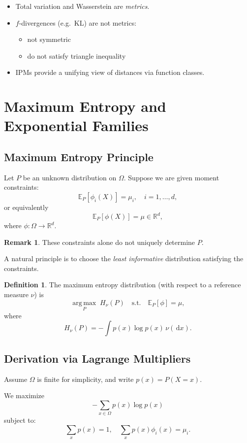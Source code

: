 \documentclass[12pt,oneside]{book}
\numberwithin{equation}{section}
\theoremstyle{definition}
\newtheorem{definition}{Definition}[section]
\newtheorem{remark}{Remark}[section]
\theoremstyle{plain}
\theoremstyle{remark}
\newcommand{\R}{\mathbb{R}}
\newcommand{\E}{\mathbb{E}}
\newcommand{\argmax}{\operatorname*{arg\,max}}
\newcommand{\dd}{\,\mathrm{d}}
\begin{document}
\begin{itemize}
\item Total variation and Wasserstein are \emph{metrics}.
\item $f$-divergences (e.g.\ KL) are not metrics:
\begin{itemize}
\item not symmetric
\item do not satisfy triangle inequality
\end{itemize}
\item IPMs provide a unifying view of distances via function classes.
\end{itemize}

\section{Maximum Entropy and Exponential Families}

\subsection{Maximum Entropy Principle}

Let $P$ be an unknown distribution on $\Omega$. Suppose we are given moment constraints:
\[
\E_P[\phi_i(X)] = \mu_i, \quad i = 1,\dots,d,
\]
or equivalently
\[
\E_P[\phi(X)] = \mu \in \R^d,
\]
where $\phi : \Omega \to \R^d$.

\begin{remark}
These constraints alone do not uniquely determine $P$.
\end{remark}

A natural principle is to choose the \emph{least informative} distribution satisfying the constraints.

\begin{definition}
The maximum entropy distribution (with respect to a reference measure $\nu$) is
\[
\argmax_{P}
\; H_\nu(P)
\quad \text{s.t.} \quad \E_P[\phi] = \mu,
\]
where
\[
H_\nu(P) = -\int p(x)\log p(x)\,\nu(\dd x).
\]
\end{definition}


\subsection*{Derivation via Lagrange Multipliers}

Assume $\Omega$ is finite for simplicity, and write $p(x) = P(X=x)$.

We maximize
\[
-\sum_{x \in \Omega} p(x)\log p(x)
\]
subject to:
\[
\sum_x p(x) = 1, \quad
\sum_x p(x)\phi_i(x) = \mu_i.
\]
\end{document}

